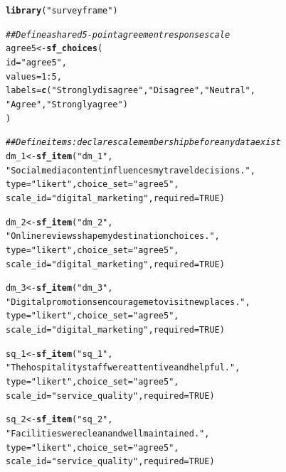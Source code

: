 \documentclass[article]{jss}\usepackage[]{graphicx}\usepackage[]{xcolor}
\makeatletter
\newcommand{\hlnum}[1]{\textcolor[rgb]{0.686,0.059,0.569}{#1}}%
\newcommand{\hlsng}[1]{\textcolor[rgb]{0.192,0.494,0.8}{#1}}%
\newcommand{\hlcom}[1]{\textcolor[rgb]{0.678,0.584,0.686}{\textit{#1}}}%
\newcommand{\hlopt}[1]{\textcolor[rgb]{0,0,0}{#1}}%
\newcommand{\hldef}[1]{\textcolor[rgb]{0.345,0.345,0.345}{#1}}%
\newcommand{\hlkwb}[1]{\textcolor[rgb]{0.69,0.353,0.396}{#1}}%
\newcommand{\hlkwc}[1]{\textcolor[rgb]{0.333,0.667,0.333}{#1}}%
\newcommand{\hlkwd}[1]{\textcolor[rgb]{0.737,0.353,0.396}{\textbf{#1}}}%
\newenvironment{kframe}{%
 \def\at@end@of@kframe{}%
 \ifinner\ifhmode%
  \def\at@end@of@kframe{\end{minipage}}%
  \begin{minipage}{\columnwidth}%
 \fi\fi%
 \def\FrameCommand##1{\hskip\@totalleftmargin \hskip-\fboxsep
 \colorbox{shadecolor}{##1}\hskip-\fboxsep
     \hskip-\linewidth \hskip-\@totalleftmargin \hskip\columnwidth}%
 \MakeFramed {\advance\hsize-\width
   \@totalleftmargin\z@ \linewidth\hsize
   \@setminipage}}%
 {\par\unskip\endMakeFramed%
 \at@end@of@kframe}
\newenvironment{knitrout}{}{} %
\makeatother
\begin{document}
\begin{knitrout}
\color{fgcolor}\begin{kframe}
\begin{alltt}
\hlkwd{library}\hldef{(}\hlsng{"surveyframe"}\hldef{)}

\hlcom{## Define a shared 5-point agreement response scale}
\hldef{agree5} \hlkwb{<-} \hlkwd{sf_choices}\hldef{(}
  \hlkwc{id}     \hldef{=} \hlsng{"agree5"}\hldef{,}
  \hlkwc{values} \hldef{=} \hlnum{1}\hlopt{:}\hlnum{5}\hldef{,}
  \hlkwc{labels} \hldef{=} \hlkwd{c}\hldef{(}\hlsng{"Strongly disagree"}\hldef{,} \hlsng{"Disagree"}\hldef{,} \hlsng{"Neutral"}\hldef{,}
             \hlsng{"Agree"}\hldef{,} \hlsng{"Strongly agree"}\hldef{)}
\hldef{)}

\hlcom{## Define items: declare scale membership before any data exist}
\hldef{dm_1} \hlkwb{<-} \hlkwd{sf_item}\hldef{(}\hlsng{"dm_1"}\hldef{,}
  \hlsng{"Social media content influences my travel decisions."}\hldef{,}
  \hlkwc{type} \hldef{=} \hlsng{"likert"}\hldef{,} \hlkwc{choice_set} \hldef{=} \hlsng{"agree5"}\hldef{,}
  \hlkwc{scale_id} \hldef{=} \hlsng{"digital_marketing"}\hldef{,} \hlkwc{required} \hldef{=} \hlnum{TRUE}\hldef{)}

\hldef{dm_2} \hlkwb{<-} \hlkwd{sf_item}\hldef{(}\hlsng{"dm_2"}\hldef{,}
  \hlsng{"Online reviews shape my destination choices."}\hldef{,}
  \hlkwc{type} \hldef{=} \hlsng{"likert"}\hldef{,} \hlkwc{choice_set} \hldef{=} \hlsng{"agree5"}\hldef{,}
  \hlkwc{scale_id} \hldef{=} \hlsng{"digital_marketing"}\hldef{,} \hlkwc{required} \hldef{=} \hlnum{TRUE}\hldef{)}

\hldef{dm_3} \hlkwb{<-} \hlkwd{sf_item}\hldef{(}\hlsng{"dm_3"}\hldef{,}
  \hlsng{"Digital promotions encourage me to visit new places."}\hldef{,}
  \hlkwc{type} \hldef{=} \hlsng{"likert"}\hldef{,} \hlkwc{choice_set} \hldef{=} \hlsng{"agree5"}\hldef{,}
  \hlkwc{scale_id} \hldef{=} \hlsng{"digital_marketing"}\hldef{,} \hlkwc{required} \hldef{=} \hlnum{TRUE}\hldef{)}

\hldef{sq_1} \hlkwb{<-} \hlkwd{sf_item}\hldef{(}\hlsng{"sq_1"}\hldef{,}
  \hlsng{"The hospitality staff were attentive and helpful."}\hldef{,}
  \hlkwc{type} \hldef{=} \hlsng{"likert"}\hldef{,} \hlkwc{choice_set} \hldef{=} \hlsng{"agree5"}\hldef{,}
  \hlkwc{scale_id} \hldef{=} \hlsng{"service_quality"}\hldef{,} \hlkwc{required} \hldef{=} \hlnum{TRUE}\hldef{)}

\hldef{sq_2} \hlkwb{<-} \hlkwd{sf_item}\hldef{(}\hlsng{"sq_2"}\hldef{,}
  \hlsng{"Facilities were clean and well maintained."}\hldef{,}
  \hlkwc{type} \hldef{=} \hlsng{"likert"}\hldef{,} \hlkwc{choice_set} \hldef{=} \hlsng{"agree5"}\hldef{,}
  \hlkwc{scale_id} \hldef{=} \hlsng{"service_quality"}\hldef{,} \hlkwc{required} \hldef{=} \hlnum{TRUE}\hldef{)}


\end{alltt}
\end{kframe}
\end{knitrout}
\end{document}
